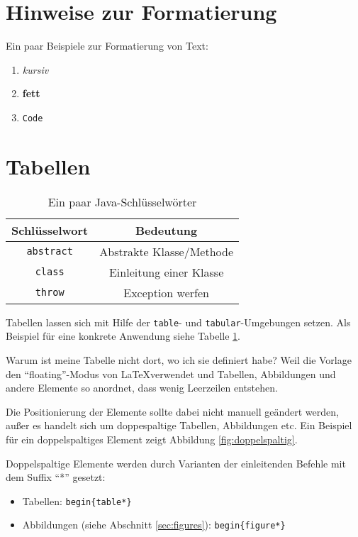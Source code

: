 \documentclass[ngerman]{ewks-latex}
\begin{document}
\section{Hinweise zur Formatierung}
Ein paar Beispiele zur Formatierung von Text:
\begin{enumerate}
\item \textit{kursiv}
\item \textbf{fett}
\item \texttt{Code}
\end{enumerate}

\section{Tabellen}
\begin{table} %
\centering %
\caption{Ein paar Java-Schlüsselwörter} %
\label{tab:example} %
\begin{tabular}{|c|c|} \hline %
Schlüsselwort & Bedeutung \\ \hline %
\texttt{abstract} & Abstrakte Klasse/Methode \\ \hline %
\texttt{class} & Einleitung einer Klasse \\ \hline %
\texttt{throw} & Exception werfen \\ \hline %
\end{tabular}
\end{table}

Tabellen lassen sich mit Hilfe der \texttt{table}- und \texttt{tabular}-Umgebungen setzen. Als Beispiel für eine konkrete Anwendung siehe Tabelle \ref{tab:example}.

Warum ist meine Tabelle nicht dort, wo ich sie definiert habe? Weil die Vorlage den "`floating"'-Modus von \LaTeX verwendet und Tabellen, Abbildungen und andere Elemente so anordnet, dass wenig Leerzeilen entstehen.

Die Positionierung der Elemente sollte dabei nicht manuell geändert werden, außer es handelt sich um doppespaltige Tabellen, Abbildungen etc. Ein Beispiel für ein doppelspaltiges Element zeigt Abbildung \ref{fig:doppelspaltig}.

Doppelspaltige Elemente werden durch Varianten der einleitenden Befehle mit dem Suffix "`*"' gesetzt:
\begin{itemize}
\item Tabellen: \texttt{begin\{table*\}}
\item Abbildungen (siehe Abschnitt \ref{sec:figures}): \texttt{begin\{figure*\}}
\end{itemize}
\end{document}
